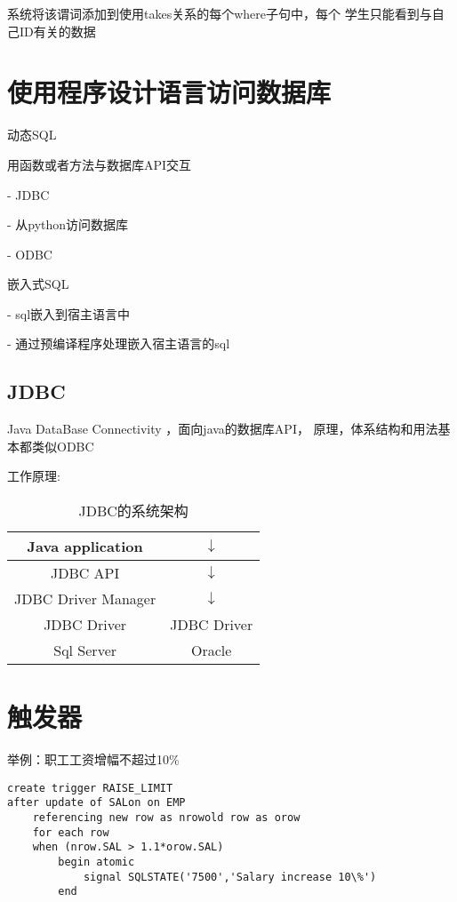 \documentclass{article}        %
\begin{document}
系统将该谓词添加到使用takes关系的每个where子句中，每个 
学生只能看到与自己ID有关的数据 

\section{使用程序设计语言访问数据库}

动态SQL

用函数或者方法与数据库API交互 

- JDBC

- 从python访问数据库

- ODBC 

嵌入式SQL

- sql嵌入到宿主语言中 

- 通过预编译程序处理嵌入宿主语言的sql

\subsection{JDBC}

Java DataBase Connectivity ，面向java的数据库API，
原理，体系结构和用法基本都类似ODBC 

工作原理: 

\begin{table}[htbp] 
    \centering 
    \caption{JDBC的系统架构}

    \begin{tabular}{|c|c|}
        \hline 
        Java application&$\downarrow$\\
        \hline 
        JDBC API& $\downarrow$\\ 
        \hline 
        JDBC Driver Manager& $\downarrow$\\ 
        \hline 
        JDBC Driver& JDBC Driver \\ 
        \hline 
        Sql Server & Oracle \\
        \hline
    \end{tabular}

\section{触发器}

举例：职工工资增幅不超过10\% 

\begin{verbatim}
create trigger RAISE_LIMIT 
after update of SALon on EMP 
    referencing new row as nrowold row as orow 
    for each row 
    when (nrow.SAL > 1.1*orow.SAL)
        begin atomic 
            signal SQLSTATE('7500','Salary increase 10\%')
        end
\end{verbatim}
    

\end{table}
\end{document}
